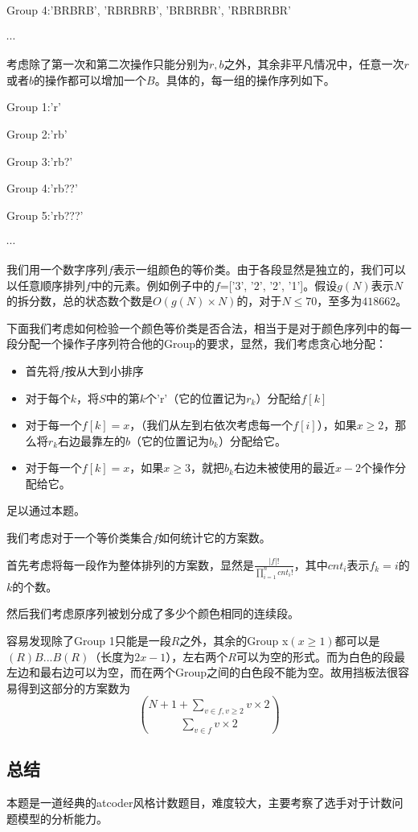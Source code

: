 \documentclass[12pt]{article}
\begin{document}
Group 4:'BRBRB', 'RBRBRB', 'BRBRBR', 'RBRBRBR'

$\cdots$

考虑除了第一次和第二次操作只能分别为$r,b$之外，其余非平凡情况中，任意一次$r$或者$b$的操作都可以增加一个$B$。具体的，每一组的操作序列如下。

Group 1:'r'

Group 2:'rb'

Group 3:'rb?'

Group 4:'rb??'

Group 5:'rb???'

$\cdots$

我们用一个数字序列$f$表示一组颜色的等价类。由于各段显然是独立的，我们可以以任意顺序排列$f$中的元素。例如例子中的$f$=['3', '2', '2', '1']。假设$g(N)$表示$N$的拆分数，总的状态数个数是$O(g(N)\times N)$的，对于$N\le 70$，至多为$418662$。

下面我们考虑如何检验一个颜色等价类是否合法，相当于是对于颜色序列中的每一段分配一个操作子序列符合他的Group的要求，显然，我们考虑贪心地分配：
\begin{itemize}
  \item 首先将$f$按从大到小排序
  \item 对于每个$k$，将$S$中的第$k$个'r'（它的位置记为$r_k$）分配给$f[k]$
  \item 对于每一个$f[k]=x$，（我们从左到右依次考虑每一个$f[i]$），如果$x\ge 2$，那么将$r_k$右边最靠左的$b$（它的位置记为$b_k$）分配给它。
  \item 对于每一个$f[k]=x$，如果$x\ge 3$，就把$b_k$右边未被使用的最近$x-2$个操作分配给它。
\end{itemize}

足以通过本题。

我们考虑对于一个等价类集合$f$如何统计它的方案数。

首先考虑将每一段作为整体排列的方案数，显然是$\frac{|f|!}{\prod_{i=1}^{n}cnt_i!}$，其中$cnt_i$表示$f_k=i$的$k$的个数。

然后我们考虑原序列被划分成了多少个颜色相同的连续段。

容易发现除了Group 1只能是一段$R$之外，其余的Group x$(x\ge 1)$都可以是$(R)B...B(R)$（长度为$2x-1$），左右两个$R$可以为空的形式。而为白色的段最左边和最右边可以为空，而在两个Group之间的白色段不能为空。故用挡板法很容易得到这部分的方案数为
$$
\binom{N + 1 + \sum_{v\in f, v\ge 2} v\times 2}{\sum_{v\in f} v\times 2}
$$

\subsection{总结}
本题是一道经典的atcoder风格计数题目，难度较大，主要考察了选手对于计数问题模型的分析能力。
\end{document}
